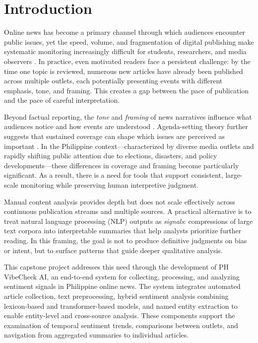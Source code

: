 \documentclass[sigconf, nonacm]{acmart}
\begin{document}
\maketitle

\section{Introduction}
Online news has become a primary channel through which audiences encounter public issues, yet the speed, volume, and fragmentation of digital publishing make systematic monitoring increasingly difficult for students, researchers, and media observers \cite{datareportal}. In practice, even motivated readers face a persistent challenge: by the time one topic is reviewed, numerous new articles have already been published across multiple outlets, each potentially presenting events with different emphasis, tone, and framing. This creates a gap between the pace of publication and the pace of careful interpretation.

Beyond factual reporting, the \emph{tone} and \emph{framing} of news narratives influence what audiences notice and how events are understood \cite{entman1993framing}. Agenda-setting theory further suggests that sustained coverage can shape which issues are perceived as important \cite{mccombs1972agenda}. In the Philippine context—characterized by diverse media outlets and rapidly shifting public attention due to elections, disasters, and policy developments—these differences in coverage and framing become particularly significant. As a result, there is a need for tools that support consistent, large-scale monitoring while preserving human interpretive judgment.

Manual content analysis provides depth but does not scale effectively across continuous publication streams and multiple sources. A practical alternative is to treat natural language processing (NLP) outputs as \emph{signals}: compressions of large text corpora into interpretable summaries that help analysts prioritize further reading. In this framing, the goal is not to produce definitive judgments on bias or intent, but to surface patterns that guide deeper qualitative analysis.

This capstone project addresses this need through the development of PH VibeCheck AI, an end-to-end system for collecting, processing, and analyzing sentiment signals in Philippine online news. The system integrates automated article collection, text preprocessing, hybrid sentiment analysis combining lexicon-based and transformer-based models, and named entity extraction to enable entity-level and cross-source analysis. These components support the examination of temporal sentiment trends, comparisons between outlets, and navigation from aggregated summaries to individual articles.
\end{document}
